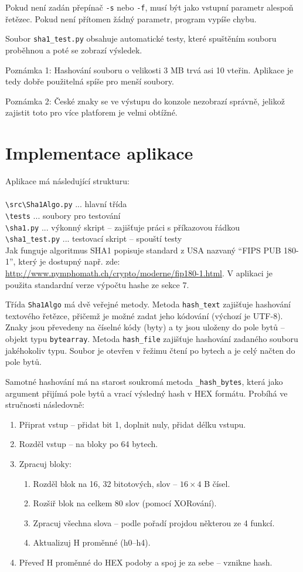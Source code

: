 \documentclass[a4paper]{article}
\begin{document}
Pokud není zadán přepínač \verb|-s| nebo \verb|-f|, musí být jako vstupní parametr alespoň řetězec. Pokud není přítomen žádný parametr, program vypíše chybu.

Soubor \verb|sha1_test.py| obsahuje automatické testy, které spuštěním souboru proběhnou a poté se zobrazí výsledek.

Poznámka 1: Hashování souboru o velikosti 3 MB trvá asi 10 vteřin. Aplikace je tedy dobře použitelná spíše pro menší soubory.

Poznámka 2: České znaky se ve výstupu do konzole nezobrazí správně, jelikož zajistit toto pro více platforem je velmi obtížné.

\section{Implementace aplikace}
Aplikace má následující strukturu:
\\ \\
\verb|\src\Sha1Algo.py| ... hlavní třída \\
\verb|\tests| ... soubory pro testování \\
\verb|\sha1.py| ... výkonný skript -- zajišťuje práci s příkazovou řádkou \\
\verb|\sha1_test.py| ... testovací skript -- spouští testy \\

Jak funguje algoritmus SHA1 popisuje standard z USA nazvaný ``FIPS PUB 180-1'', který je dostupný např. zde: \url{http://www.nymphomath.ch/crypto/moderne/fip180-1.html}. V aplikaci je použita standardní verze výpočtu hashe ze sekce 7. 

Třída \verb|Sha1Algo| má dvě veřejné metody. Metoda \verb|hash_text| zajišťuje hashování textového řetězce, přičemž je možné zadat jeho kódování (výchozí je UTF-8). Znaky jsou převedeny na číselné kódy (byty) a ty jsou uloženy do pole bytů -- objekt typu \texttt{bytearray}. 
Metoda \verb|hash_file| zajišťuje hashování zadaného souboru jakéhokoliv typu. Soubor je otevřen v řežimu čtení po bytech a je celý načten do pole bytů. 

Samotné hashování má na starost soukromá metoda \verb|_hash_bytes|, která jako argument přijímá pole bytů a vrací výsledný hash v HEX formátu. Probíhá ve stručnosti následovně:
\begin{enumerate}
\item Připrat vstup -- přidat bit 1, doplnit nuly, přidat délku vstupu.
\item Rozděl vstup -- na bloky po 64 bytech.
\item Zpracuj bloky:
	\begin{enumerate}
	\item Rozděl blok na 16, 32 bitotových, slov -- $16\times4$ B čísel.
	\item Rozšiř blok na celkem 80 slov (pomocí XORování).
	\item Zpracuj všechna slova -- podle pořadí projdou některou ze 4 funkcí.
	\item Aktualizuj H proměnné (h0--h4).
	\end{enumerate}
\item Převeď H proměnné do HEX podoby a spoj je za sebe -- vznikne hash.
\end{enumerate}
\end{document}
